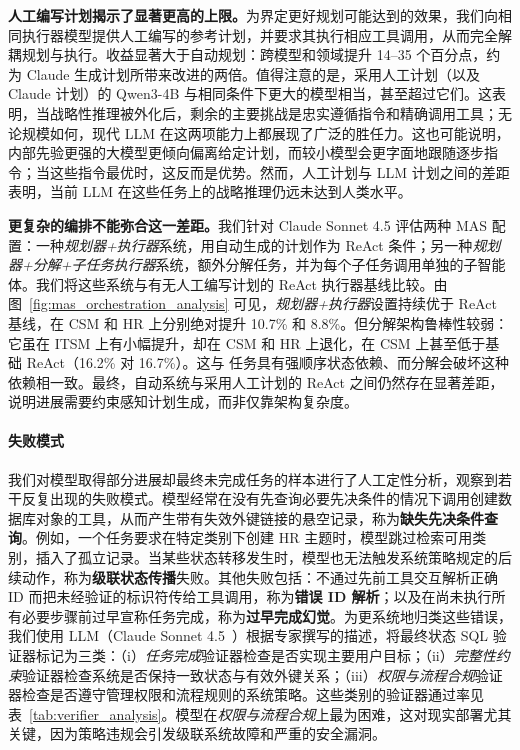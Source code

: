 \textbf{人工编写计划揭示了显著更高的上限。}为界定更好规划可能达到的效果，我们向相同执行器模型提供人工编写的参考计划，并要求其执行相应工具调用，从而完全解耦规划与执行。收益显著大于自动规划：跨模型和领域提升 14--35 个百分点，约为 Claude 生成计划所带来改进的两倍。值得注意的是，采用人工计划（以及 Claude 计划）的 Qwen3-4B 与相同条件下更大的模型相当，甚至超过它们。这表明，当战略性推理被外化后，剩余的主要挑战是忠实遵循指令和精确调用工具；无论规模如何，现代 LLM 在这两项能力上都展现了广泛的胜任力。这也可能说明，内部先验更强的大模型更倾向偏离给定计划，而较小模型会更字面地跟随逐步指令；当这些指令最优时，这反而是优势。然而，人工计划与 LLM 计划之间的差距表明，当前 LLM 在这些任务上的战略推理仍远未达到人类水平。

\textbf{更复杂的编排不能弥合这一差距。}我们针对 Claude Sonnet 4.5 评估两种 MAS 配置：一种\textit{规划器+执行器}系统，用自动生成的计划作为 ReAct 条件；另一种\textit{规划器+分解+子任务执行器}系统，额外分解任务，并为每个子任务调用单独的子智能体。我们将这些系统与有无人工编写计划的 ReAct 执行器基线比较。由图~\ref{fig:mas_orchestration_analysis} 可见，\textit{规划器+执行器}设置持续优于 ReAct 基线，在 CSM 和 HR 上分别绝对提升 10.7\% 和 8.8\%。但分解架构鲁棒性较弱：它虽在 ITSM 上有小幅提升，却在 CSM 和 HR 上退化，在 CSM 上甚至低于基础 ReAct（16.2\% 对 16.7\%）。这与 \ours{} 任务具有强顺序状态依赖、而分解会破坏这种依赖相一致。最终，自动系统与采用人工计划的 ReAct 之间仍然存在显著差距，说明进展需要约束感知计划生成，而非仅靠架构复杂度。

\paragraph{失败模式}
我们对模型取得部分进展却最终未完成任务的样本进行了人工定性分析，观察到若干反复出现的失败模式。模型经常在没有先查询必要先决条件的情况下调用创建数据库对象的工具，从而产生带有失效外键链接的悬空记录，称为\textbf{缺失先决条件查询}。例如，一个任务要求在特定类别下创建 HR 主题时，模型跳过检索可用类别，插入了孤立记录。当某些状态转移发生时，模型也无法触发系统策略规定的后续动作，称为\textbf{级联状态传播}失败。其他失败包括：不通过先前工具交互解析正确 ID 而把未经验证的标识符传给工具调用，称为\textbf{错误 ID 解析}；以及在尚未执行所有必要步骤前过早宣称任务完成，称为\textbf{过早完成幻觉}。为更系统地归类这些错误，我们使用 LLM（Claude Sonnet 4.5~\cite{claudeopus}）根据专家撰写的描述，将最终状态 SQL 验证器标记为三类：（i）\textit{任务完成}验证器检查是否实现主要用户目标；（ii）\textit{完整性约束}验证器检查系统是否保持一致状态与有效外键关系；（iii）\textit{权限与流程合规}验证器检查是否遵守管理权限和流程规则的系统策略。这些类别的验证器通过率见表~\ref{tab:verifier_analysis}。模型在\textit{权限与流程合规}上最为困难，这对现实部署尤其关键，因为策略违规会引发级联系统故障和严重的安全漏洞。

